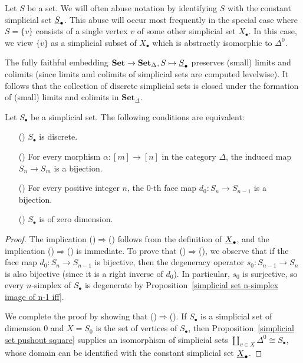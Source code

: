 Let $S$ be a set. We will often abuse notation by identifying $S$ with the constant simplicial set $\uline{S}_\bullet$. This abuse will occur most frequently in the special case where $S=\{v\}$ consists of a single vertex $v$ of some other simplicial set $X_\bullet$. In this case, we view $\{v\}$ as a simplicial subset of $X_\bullet$ which is abstractly isomorphic to $\Delta^0$.
\begin{remark}
The fully faithful embedding $\mathbf{Set}\to\mathbf{Set}_\Delta,S\mapsto\uline{S}_\bullet$ preserves (small) limits and colimits (since limits and colimits of simplicial sets are computed levelwise). It follows that the collection of discrete simplicial sets is closed under the formation of (small) limits and colimits in $\mathbf{Set}_\Delta$.
\end{remark}
\begin{proposition}\label{simplicial set discrete iff}
Let $S_\bullet$ be a simplicial set. The following conditions are equivalent:
\begin{itemize}
\item[(\rmnum{1})] $S_\bullet$ is discrete.
\item[(\rmnum{2})] For every morphism $\alpha:[m]\to[n]$ in the category $\Delta$, the induced map $S_n\to S_m$ is a bijection.
\item[(\rmnum{3})] For every positive integer $n$, the $0$-th face map $d_0:S_n\to S_{n-1}$ is a bijection.
\item[(\rmnum{4})] $S_\bullet$ is of zero dimension.   
\end{itemize}
\end{proposition}
\begin{proof}
The implication ()$\Rightarrow$() follows from the definition of $\uline{X}_\bullet$, and the implication ()$\Rightarrow$() is immediate. To prove that ()$\Rightarrow$(), we observe that if the face map $d_0:S_n\to S_{n-1}$ is bijective, then the degeneracy operator $s_0:S_{n-1}\to S_n$ is also bijective (since it is a right inverse of $d_0$). In particular, $s_0$ is surjective, so every $n$-simplex of $S_\bullet$ is degenerate by Proposition~\ref{simplicial set n-simplex image of n-1 iff}.\par
We complete the proof by showing that ()$\Rightarrow$(). If $S_\bullet$ is a simplicial set of dimension $0$ and $X=S_0$ is the set of vertices of $S_\bullet$, then Proposition~\ref{simplicial set pushout square} supplies an isomorphism of simplicial sets $\amalg_{v\in X}\Delta^0\cong S_\bullet$, whose domain can be identified with the constant simplicial set $\uline{X}_\bullet$.
\end{proof}
